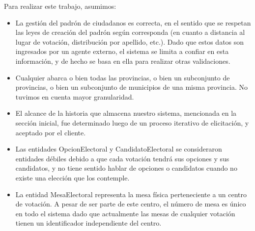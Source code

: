Para realizar este trabajo, asumimos:
\begin{itemize}
 \item La gestión del padrón de ciudadanos es correcta, en el sentido que se respetan las leyes de creación
 del padrón según corresponda (en cuanto a distancia al lugar de votación, distribución por apellido, etc.).
 Dado que estos datos son ingresados por un agente externo, el sistema se limita a confiar en esta información, 
 y de hecho se basa en ella para realizar otras validaciones.
 
 \item Cualquier  abarca o bien todas las provincias, o bien un subconjunto de provincias, o bien un subconjunto
 de municipios de una misma provincia. No tuvimos en cuenta mayor granularidad.
 
 \item El alcance de la historia que almacena nuestro sistema, mencionada en la sección inicial, fue determinado
 luego de un proceso iterativo de elicitación, y aceptado por el cliente.
 
 \item Las entidades OpcionElectoral y CandidatoElectoral se consideraron entidades débiles debido a que cada
 votación tendrá sus opciones y sus candidatos, y no tiene sentido hablar de opciones o candidatos cuando no
 existe una elección que los contemple.
 
 \item La entidad MesaElectoral representa la mesa física perteneciente a un centro de votación. A pesar de
 ser parte de este centro, el número de mesa es único en todo el sistema dado que actualmente las mesas de
 cualquier votación tienen un identificador independiente del centro.
\end{itemize}






